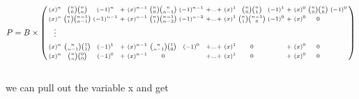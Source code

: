 \begin{gather*}
    P=B \times
    \begin{psmallmatrix}
        (x)^{n} & {n \choose 0}    {n \choose n}     & (-1)^{n}   & + & (x)^{n-1} & {n \choose 0}   {n \choose n-1}   & (-1)^{n-1} & + \hdots + & (x)^{1} & {n \choose 0} {n \choose 1}   & (-1)^{1} & + & (x)^{0} & {n \choose 0}    {n \choose 0}   & (-1)^{0} \\
        (x)^{n} & {n \choose 1}    {n-1 \choose n-1} & (-1)^{n-1} & + & (x)^{n-1} & {n \choose 1}   {n-1 \choose n-2} & (-1)^{n-2} & + \hdots + & (x)^{1} & {n \choose 1} {n-1 \choose 0} & (-1)^{0} & + & (x)^{0} & 0                                           \\
        \vdots                                                                                                                                                                                                                                                   \\
        & \\
        (x)^{n} & {n \choose n-1}  {1 \choose 1}     & (-1)^{1}   & + & (x)^{n-1} & {n \choose n-1} {1 \choose 0}     & (-1)^{0}   & + \hdots + & (x)^{1} & 0                             &          & + & (x)^{0} & 0                                           \\
        (x)^{n} & {n \choose n}    {0 \choose 0}     & (-1)^{0}   & + & (x)^{n-1} & 0                                 &            & + \hdots + & (x)^{1} & 0                             &          & + & (x)^{0} & 0                                           \\
    \end{psmallmatrix}
\end{gather*}
\\ we can pull out the variable x and get

